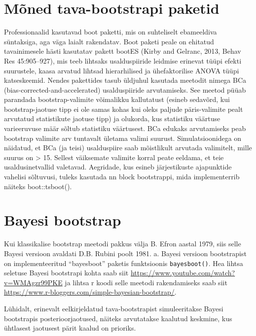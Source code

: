 \documentclass[]{book}
\begin{document}
\section{Mõned tava-bootstrapi
paketid}\label{moned-tava-bootstrapi-paketid}

Professionaalid kasutavad boot paketti, mis on suhteliselt ebameeldiva
süntaksiga, aga väga laialt rakendatav. Boot paketi peale on ehitatud
tavainimesele hästi kasutatav pakett bootES (Kirby and Gelranc, 2013,
Behav Res 45:905--927), mis teeb lihtsaks usalduspiiride leidmise
erinevat tüüpi efekti suurustele, kaasa arvatud lihtsad hierarhilised ja
ühefaktorilise ANOVA tüüpi katseskeemid. Nendes pakettides tasub
üldjuhul kasutada meetodit nimega BCa (bias-corrected-and-accelerated)
usalduspiiride arvutamiseks. See meetod püüab parandada
bootstrap-valimite võimalikku kallutatust (esineb sedavõrd, kui
bootstrap-jaotuse tipp ei ole samas kohas kui oleks paljude
päris-valimite pealt arvutatud statistikute jaotuse tipp) ja olukorda,
kus statistiku väärtuse varieeruvuse määr sõltub statistiku väärtusest.
BCa edukaks arvutamiseks peab bootstrap valimite arv tuntavalt ületama
valimi suurust. Simulatsioonidega on näidatud, et BCa (ja teisi)
usalduspiire saab mõistlikult arvutada valimitelt, mille suurus on
\textgreater{} 15. Sellest väiksemate valimite korral peate eeldama, et
teie usaldusinetvallid valetavad. Aegridade, kus esineb järjestikuste
ajapunktide vahelisi sõltuvusi, tuleks kasutada nn block bootstrappi,
mida implementerrib näiteks boot::tsboot().

\section*{Bayesi bootstrap}\label{bayesi-bootstrap}

Kui klassikalise bootstrap meetodi pakkus välja B. Efron aastal 1979,
siis selle Bayesi versioon avaldati D.B. Rubini poolt 1981. a. Bayesi
versioon bootstrapist on implementeeritud ``bayesboot'' paketis
funktsioonis \texttt{bayesboot()}. Hea lihtsa seletuse Bayesi bootstrapi
kohta saab siit \url{https://www.youtube.com/watch?v=WMAgzr99PKE} ja
lihtsa r koodi selle meetodi rakendamiseks saab siit
\url{https://www.r-bloggers.com/simple-bayesian-bootstrap/}.

Lühidalt, erinevalt eelkirjeldatud tava-bootstrapist simuleeritakse
Bayesi bootstrapis posterioorjaotused, näiteks arvutatakse kaalutud
keskmine, kus ühtlasest jaotusest pärit kaalud on prioriks.
\end{document}
